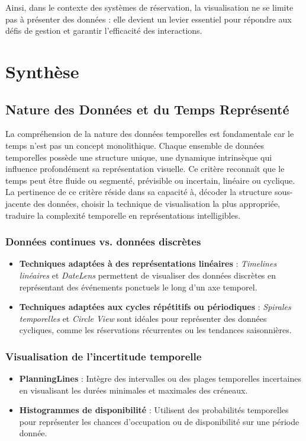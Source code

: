 \documentclass[runningheads]{llncs}
\begin{document}
Ainsi, dans le contexte des systèmes de réservation, la visualisation ne se limite pas à présenter des données : elle devient un levier essentiel pour répondre aux défis de gestion et garantir l’efficacité des interactions.

\section{Synthèse}

\subsection{Nature des Données et du Temps Représenté}
La compréhension de la nature des données temporelles est fondamentale car le temps n'est pas un concept monolithique. Chaque ensemble de données temporelles possède une structure unique, une dynamique intrinsèque qui influence profondément sa représentation visuelle. Ce critère reconnaît que le temps peut être fluide ou segmenté, prévisible ou incertain, linéaire ou cyclique.
La pertinence de ce critère réside dans sa capacité à, décoder la structure sous-jacente des données, choisir la technique de visualisation la plus appropriée, traduire la complexité temporelle en représentations intelligibles.
\subsubsection{Données continues vs. données discrètes}
\begin{itemize}
    \item \textbf{Techniques adaptées à des représentations linéaires} : \emph{Timelines linéaires} et \emph{DateLens} permettent de visualiser des données discrètes en représentant des événements ponctuels le long d'un axe temporel.
    \item \textbf{Techniques adaptées aux cycles répétitifs ou périodiques} : \emph{Spirales temporelles} et \emph{Circle View} sont idéales pour représenter des données cycliques, comme les réservations récurrentes ou les tendances saisonnières.
\end{itemize}

\subsubsection{Visualisation de l'incertitude temporelle}
\begin{itemize}
    \item \textbf{PlanningLines} : Intègre des intervalles ou des plages temporelles incertaines en visualisant les durées minimales et maximales des créneaux.
    \item \textbf{Histogrammes de disponibilité} : Utilisent des probabilités temporelles pour représenter les chances d'occupation ou de disponibilité sur une période donnée.
\end{itemize}
\end{document}
